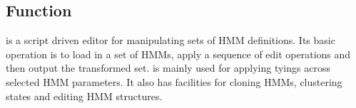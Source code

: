 %
%
\newpage
{}

\subsection{Function}

 is a script driven editor for manipulating sets of HMM definitions.
Its basic operation is to load in a set of HMMs, apply a sequence of edit
operations and then output the transformed set.  is mainly used for
applying tyings across selected HMM parameters.  It also has facilities for
cloning HMMs, clustering states and editing HMM structures.

